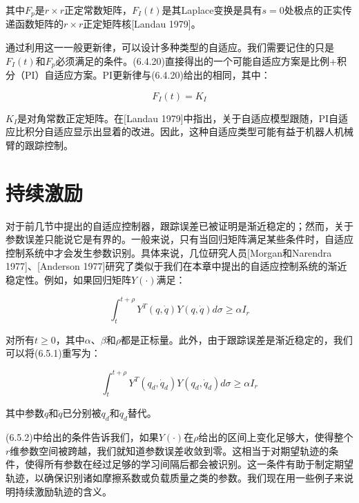 \documentclass[12pt,a4paper]{ctexart}
\begin{document}
其中$F_p$是$r \times r$正定常数矩阵，$F_I(t)$是其Laplace变换是具有$s=0$处极点的正实传递函数矩阵的$r \times r$正定矩阵核[Landau 1979]。

通过利用这一一般更新律，可以设计多种类型的自适应。我们需要记住的只是$F_I(t)$和$F_p$必须满足的条件。(6.4.20)直接得出的一个可能自适应方案是比例+积分（PI）自适应方案。PI更新律与(6.4.20)给出的相同，其中：

\begin{equation}\label{eq:PI-update}
F_I(t) = K_I
\end{equation}

$K_I$是对角常数正定矩阵。在[Landau 1979]中指出，关于自适应模型跟随，PI自适应比积分自适应显示出显着的改进。因此，这种自适应类型可能有益于机器人机械臂的跟踪控制。

\section{持续激励}\label{sec:persistency}

对于前几节中提出的自适应控制器，跟踪误差已被证明是渐近稳定的；然而，关于参数误差只能说它是有界的。一般来说，只有当回归矩阵满足某些条件时，自适应控制系统中才会发生参数识别。具体来说，几位研究人员[Morgan和Narendra 1977]、[Anderson 1977]研究了类似于我们在本章中提出的自适应控制系统的渐近稳定性。例如，如果回归矩阵$Y(\cdot)$满足：

\begin{equation}\label{eq:persistency}
\int_t^{t+\rho} Y^T(q, \dot{q})Y(q, \dot{q})d\sigma \geq \alpha I_r
\end{equation}

对所有$t \geq 0$，其中$\alpha$、$\beta$和$\rho$都是正标量。此外，由于跟踪误差是渐近稳定的，我们可以将(6.5.1)重写为：

\begin{equation}\label{eq:persistency2}
\int_t^{t+\rho} Y^T(q_d, \dot{q}_d)Y(q_d, \dot{q}_d)d\sigma \geq \alpha I_r
\end{equation}

其中参数$q$和$\dot{q}$已分别被$q_d$和$\dot{q}_d$替代。

(6.5.2)中给出的条件告诉我们，如果$Y(\cdot)$在$\rho$给出的区间上变化足够大，使得整个$r$维参数空间被跨越，我们就知道参数误差收敛到零。这相当于对期望轨迹的条件，使得所有参数在经过足够的学习间隔后都会被识别。这一条件有助于制定期望轨迹，以确保识别诸如摩擦系数或负载质量之类的参数。我们现在用一些例子来说明持续激励轨迹的含义。
\end{document}
